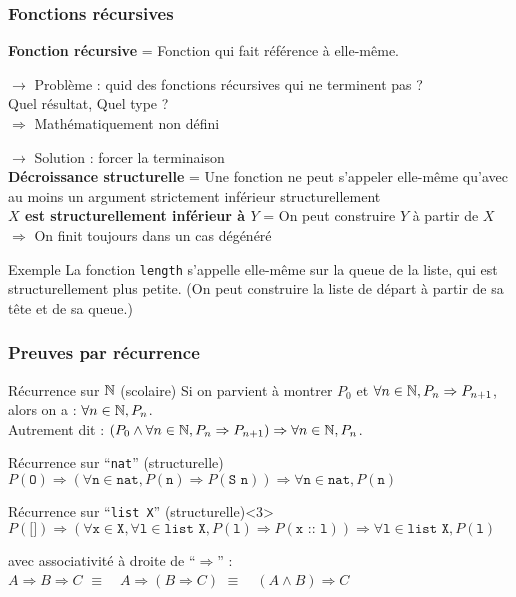\documentclass[9pt,handout]{beamer}
\newenvironment{ex}[1][Exemple]{\begin{exampleblock}{#1}}{\end{exampleblock}}
\newenvironment{code}[1][Code]{\begin{block}{#1}}{\end{block}}
\newcommand{\defi}[1]{\textbf{#1}}
\begin{document}
\begin{frame}
\frametitle{Fonctions récursives}

\defi{Fonction récursive} = Fonction qui fait référence à elle-même.

\medskip
$\rightarrow$ Problème : quid des fonctions récursives qui ne terminent pas ?\\
Quel résultat, Quel type ?\\
\quad$\Rightarrow$ Mathématiquement non défini

\pause
\medskip
$\rightarrow$ Solution : forcer la terminaison\\
\defi{Décroissance structurelle} = Une fonction ne peut s'appeler elle-même qu'avec au moins un argument strictement inférieur structurellement\\
\defi{$X$ est structurellement inférieur à $Y$} = On peut construire $Y$ à partir de $X$\\
\quad$\Rightarrow$ On finit toujours dans un cas dégénéré

\pause
\begin{ex}
La fonction \texttt{length} s'appelle elle-même sur la queue de la liste, qui est structurellement plus petite. (On peut construire la liste de départ à partir de sa tête et de sa queue.)
\end{ex}


\end{frame}



\begin{frame}
\frametitle{Preuves par récurrence}

\begin{ex}[Récurrence sur $\mathbb{N}$ (scolaire)]
Si on parvient à montrer $P_0$ et $\forall n \in \mathbb{N}, P_n \Rightarrow P_{n+1}$, alors on a : $\forall n \in \mathbb{N}, P_n$.
\\Autrement dit : 
$(P_0 \wedge \forall n \in \mathbb{N}, P_n \Rightarrow P_{n+1}) \Rightarrow \forall n \in \mathbb{N}, P_n$.
\end{ex}

\pause
\begin{code}[Récurrence sur “\texttt{nat}” (structurelle)]
$P(\texttt{O}) \Rightarrow
  (\forall \texttt{n} \in \texttt{nat}, P(\texttt{n}) \Rightarrow P(\texttt{S n})) \Rightarrow
  \forall \texttt{n} \in \texttt{nat}, P(\texttt{n})$
\end{code}

\begin{code}[Récurrence sur “\texttt{list X}” (structurelle)]<3>
$P(\texttt{[]}) \Rightarrow
  (\forall \texttt{x} \in \texttt{X}, \forall \texttt{l} \in \texttt{list X}, P(\texttt{l}) \Rightarrow P(\texttt{x :: l})) \Rightarrow
  \forall \texttt{l} \in \texttt{list X}, P(\texttt{l})$
\end{code}

avec associativité à droite de “$\Rightarrow$” :
\\\quad$A \Rightarrow B \Rightarrow C$
\quad$\equiv\quad A \Rightarrow (B \Rightarrow C)$
\quad$\equiv\quad (A \wedge B) \Rightarrow C$
\end{frame}
\end{document}

